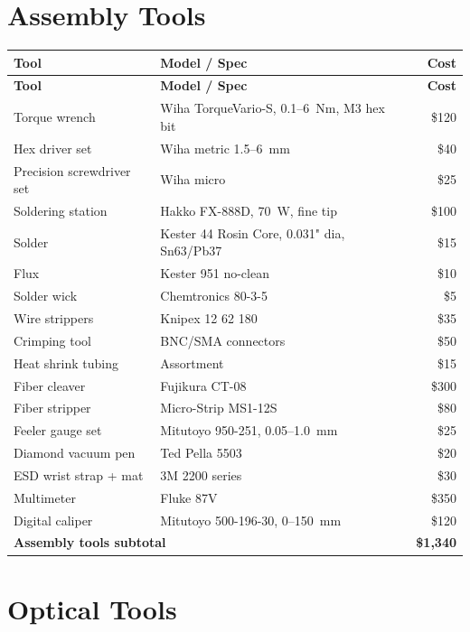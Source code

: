 \documentclass[11pt,a4paper,openany]{book}
\begin{document}
\section{Assembly Tools}

\begin{center}
\begin{longtable}{p{5cm}lr}
\toprule
\textbf{Tool} & \textbf{Model / Spec} & \textbf{Cost} \\
\midrule
\endfirsthead
\toprule
\textbf{Tool} & \textbf{Model / Spec} & \textbf{Cost} \\
\midrule
\endhead
\bottomrule
\endfoot
\bottomrule
\endlastfoot
Torque wrench & Wiha TorqueVario-S, 0.1--6~Nm, M3 hex bit & \$120 \\
Hex driver set & Wiha metric 1.5--6~mm & \$40 \\
Precision screwdriver set & Wiha micro & \$25 \\
Soldering station & Hakko FX-888D, 70~W, fine tip & \$100 \\
Solder & Kester 44 Rosin Core, 0.031" dia, Sn63/Pb37 & \$15 \\
Flux & Kester 951 no-clean & \$10 \\
Solder wick & Chemtronics 80-3-5 & \$5 \\
Wire strippers & Knipex 12 62 180 & \$35 \\
Crimping tool & BNC/SMA connectors & \$50 \\
Heat shrink tubing & Assortment & \$15 \\
Fiber cleaver & Fujikura CT-08 & \$300 \\
Fiber stripper & Micro-Strip MS1-12S & \$80 \\
Feeler gauge set & Mitutoyo 950-251, 0.05--1.0~mm & \$25 \\
Diamond vacuum pen & Ted Pella 5503 & \$20 \\
ESD wrist strap + mat & 3M 2200 series & \$30 \\
Multimeter & Fluke 87V & \$350 \\
Digital caliper & Mitutoyo 500-196-30, 0--150~mm & \$120 \\
\midrule
\multicolumn{2}{l}{\textbf{Assembly tools subtotal}} & \textbf{\$1,340} \\
\end{longtable}
\end{center}

\section{Optical Tools}
\end{document}

